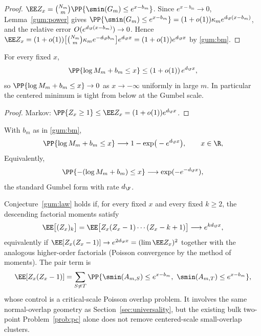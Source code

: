 \begin{proof}
$\EE Z_x=\binom{N_m}{m}\PP\{\smin(G_m)\le e^{x-b_m}\}$.  Since $e^{x-b_m}\to0$,
Lemma~\ref{gum:power} gives
$\PP\{\smin(G_m)\le e^{x-b_m}\}=(1+o(1))\kappa_m e^{d_\F(x-b_m)}$, and the relative
error $O(e^{d_\F(x-b_m)})\to0$.  Hence
$\EE Z_x=(1+o(1))\big[\binom{N_m}{m}\kappa_m e^{-d_\F b_m}\big]e^{d_\F x}
=(1+o(1))e^{d_\F x}$ by \eqref{gum:bm}.
\end{proof}

\begin{corollary}\label{gum:onesided}
For every fixed $x$,
\[
  \PP\{\log M_m+b_m\le x\}\le(1+o(1))\,e^{d_\F x},
\]
so $\PP\{\log M_m+b_m\le x\}\to0$ as $x\to-\infty$ uniformly in large $m$.  In
particular the centered minimum is tight from below at the Gumbel scale.
\end{corollary}

\begin{proof}
Markov: $\PP\{Z_x\ge1\}\le\EE Z_x=(1+o(1))e^{d_\F x}$.
\end{proof}

\begin{conjecture}\label{gum:law}
With $b_m$ as in \eqref{gum:bm},
\[
  \PP\{\log M_m+b_m\le x\}\longrightarrow 1-\exp\!\big(-e^{d_\F x}\big),\qquad x\in\R,
\]
Equivalently,
\[
  \PP\{-(\log M_m+b_m)\le x\}\longrightarrow \exp(-e^{-d_\F x}),
\]
the standard Gumbel form with rate $d_\F$.
\end{conjecture}

\begin{proposition}\label{gum:reduction}
Conjecture~\ref{gum:law} holds if, for every fixed $x$ and every fixed $k\ge2$, the
descending factorial moments satisfy
\[
  \EE\big[(Z_x)_k\big]=\EE\big[Z_x(Z_x-1)\cdots(Z_x-k+1)\big]\longrightarrow e^{k d_\F x},
\]
equivalently if $\EE[Z_x(Z_x-1)]\to e^{2d_\F x}=(\lim\EE Z_x)^2$ together with the
analogous higher-order factorials (Poisson convergence by the method of moments).
The pair term is
\[
  \EE[Z_x(Z_x-1)]=\sum_{S\ne T}\PP\{\smin(A_{m,S})\le e^{x-b_m},\ \smin(A_{m,T})\le e^{x-b_m}\},
\]
whose control is a critical-scale Poisson overlap problem.  It involves the
same normal-overlap geometry as Section~\ref{sec:universality}, but the existing
bulk two-point Problem~\ref{prob:pc} alone does not remove centered-scale
small-overlap clusters.
\end{proposition}

